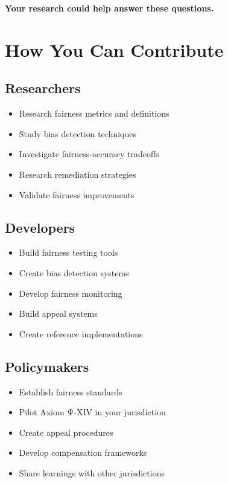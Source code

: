 \textbf{Your research could help answer these questions.}

\vspace{0.5cm}

\section{How You Can Contribute}

\subsection{Researchers}

\begin{itemize}
    \item Research fairness metrics and definitions
    \item Study bias detection techniques
    \item Investigate fairness-accuracy tradeoffs
    \item Research remediation strategies
    \item Validate fairness improvements
\end{itemize}

\subsection{Developers}

\begin{itemize}
    \item Build fairness testing tools
    \item Create bias detection systems
    \item Develop fairness monitoring
    \item Build appeal systems
    \item Create reference implementations
\end{itemize}

\subsection{Policymakers}

\begin{itemize}
    \item Establish fairness standards
    \item Pilot Axiom Ψ-XIV in your jurisdiction
    \item Create appeal procedures
    \item Develop compensation frameworks
    \item Share learnings with other jurisdictions
\end{itemize}

